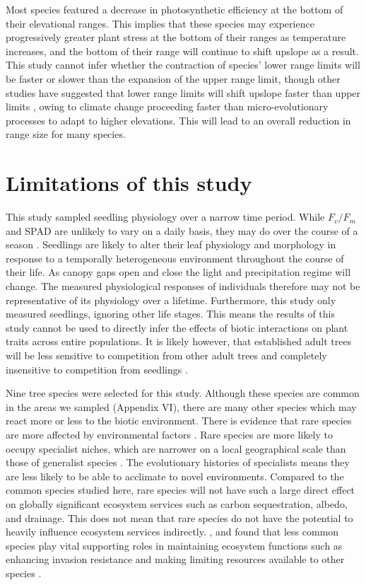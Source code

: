 \documentclass[a4paper,11pt]{article}
\begin{document}
Most species featured a decrease in photosynthetic efficiency at the bottom of their elevational ranges. This implies that these species may experience progressively greater plant stress at the bottom of their ranges as temperature increases, and the bottom of their range will continue to shift upslope as a result. This study cannot infer whether the contraction of species' lower range limits will be faster or slower than the expansion of the upper range limit, though other studies have suggested that lower range limits will shift upslope faster than upper limits \citep{Campbell2007}, owing to climate change proceeding faster than micro-evolutionary processes to adapt to higher elevations. This will lead to an overall reduction in range size for many species.

\section{Limitations of this study}
This study sampled seedling physiology over a narrow time period. While $F_v/F_m$ and SPAD are unlikely to vary on a daily basis, they may do over the course of a season \citep{Porcar-Castell2008}. Seedlings are likely to alter their leaf physiology and morphology in response to a temporally heterogeneous environment throughout the course of their life. As canopy gaps open and close the light and precipitation regime will change. The measured physiological responses of individuals therefore may not be representative of its physiology over a lifetime. Furthermore, this study only measured seedlings, ignoring other life stages. This means the results of this study cannot be used to directly infer the effects of biotic interactions on plant traits across entire populations. It is likely however, that established adult trees will be less sensitive to competition from other adult trees and completely insensitive to competition from seedlings \citep{Paine2008}. 

Nine tree species were selected for this study. Although these species are common in the areas we sampled (Appendix VI), there are many other species which may react more or less to the biotic environment. There is evidence that rare species are more affected by environmental factors \citep{Lyons2005,Mouillot2013}. Rare species are more likely to occupy specialist niches, which are narrower on a local geographical scale than those of generalist species \citep{Boulangeat2012}. The evolutionary histories of specialists means they are less likely to be able to acclimate to novel environments. Compared to the common species studied here, rare species will not have such a large direct effect on globally significant ecosystem services such as carbon sequestration, albedo, and drainage. This does not mean that rare species do not have the potential to heavily influence ecosystem services indirectly. \citet{Lyons2001}, and \citet{Lyons2005} found that less common species play vital supporting roles in maintaining ecosystem functions such as enhancing invasion resistance and making limiting resources available to other species  . 
\end{document}
